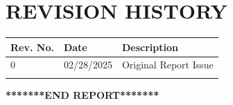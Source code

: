 \hypertarget{revision-history}{%
\section{\texorpdfstring{\textbf{REVISION
HISTORY}}{REVISION HISTORY}}\label{revision-history}}

\begin{longtable}[]{@{}lll@{}}
\toprule
\textbf{Rev. No.} & \textbf{Date} & \textbf{Description}\tabularnewline
\midrule
\endhead
0 & 02/28/2025 & Original Report Issue\tabularnewline
& &\tabularnewline
\bottomrule
\end{longtable}

\textbf{*******END REPORT*******}
